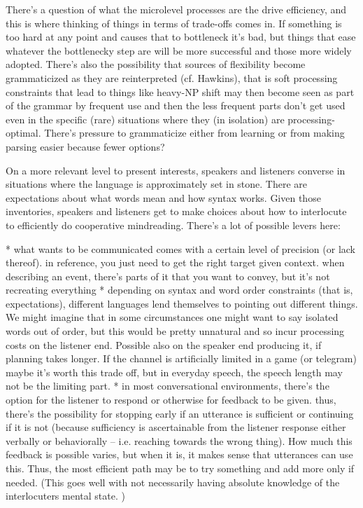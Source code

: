 \documentclass[]{article}
\begin{document}
There's a question of what the microlevel processes are the drive efficiency, and this is where thinking of things in terms of trade-offs comes in. If something is too hard at any point and causes that to bottleneck it's bad, but things that ease whatever the bottlenecky step are will be more successful and those more widely adopted. There's also the possibility that sources of flexibility become grammaticized as they are reinterpreted (cf. Hawkins), that is soft processing constraints that lead to things like heavy-NP shift may then become seen as part of the grammar by frequent use and then the less frequent parts don't get used even in the specific (rare) situations where they (in isolation) are processing-optimal. There's pressure to grammaticize either from learning or from making parsing easier because fewer options? 

On a more relevant level to present interests, speakers and listeners converse in situations where the language is approximately set in stone. There are expectations about what words mean and how syntax works. Given those inventories, speakers and listeners get to make choices about how to interlocute to efficiently do cooperative mindreading. There's a lot of possible levers here: 

* what wants to be communicated comes with a certain level of precision (or lack thereof). in reference, you just need to get the right target given context. when describing an event, there's parts of it that you want to convey, but it's not recreating everything
* depending on syntax and word order constraints (that is, expectations), different languages lend themselves to pointing out different things. We might imagine that in some circumstances one might want to say isolated words out of order, but this would be pretty unnatural and so incur processing costs on the listener end. Possible also on the speaker end producing it, if planning takes longer. If the channel is artificially limited in a game (or telegram) maybe it's worth this trade off, but in everyday speech, the speech length may not be the limiting part. 
* in most conversational environments, there's the option for the listener to respond or otherwise for feedback to be given. thus, there's the possibility for stopping early if an utterance is sufficient or continuing if it is not (because sufficiency is ascertainable from the listener response either verbally or behaviorally -- i.e. reaching towards the wrong thing). How much this feedback is possible varies, but when it is, it makes sense that utterances can use this. Thus, the most efficient path may be to try something and add more only if needed. (This goes well with not necessarily having absolute knowledge of the interlocuters mental state. )
\end{document}
